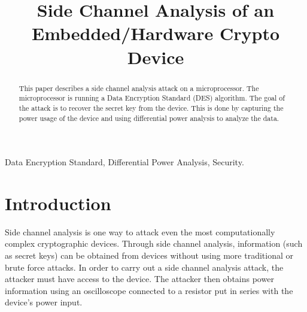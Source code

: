 
\usepackage{tikz}
\usepackage{verbatim}
\usepackage{listings}


\title{Side Channel Analysis of an Embedded/Hardware Crypto Device}

\author{
}

\maketitle


\begin{abstract}
%
This paper describes a side channel analysis attack on a microprocessor.  The microprocessor is running a Data Encryption Standard (DES) algorithm.  The goal of the attack is to recover the secret key from the device.  This is done by capturing the power usage of the device and using differential power analysis to analyze the data. 
 
\end{abstract}

\begin{IEEEkeywords}
Data Encryption Standard, Differential Power Analysis, Security.
\end{IEEEkeywords}

\section{Introduction}
	Side channel analysis is one way to attack even the most computationally complex cryptographic devices.  Through side channel analysis, information (such as secret keys) can be obtained from devices without using more traditional or brute force attacks.  In order to carry out a side channel analysis attack, the attacker must have access to the device.  The attacker then obtains power information using an oscilloscope connected to a resistor put in series with the device's power input.

